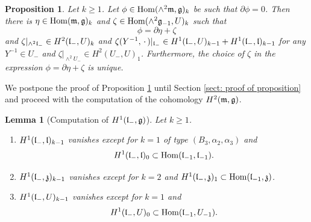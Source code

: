 \documentclass[12pt]{amsart}
\theoremstyle{plain}
\newtheorem{lemma} [theorem]{Lemma}
\newtheorem{proposition}[theorem]{Proposition}
\theoremstyle{definition}
\def\Hom{\operatorname{Hom}}
\begin{document}
\begin{proposition} \label{prop: computation of H2 cohomology} Let $k \geq 1$.
%
 Let $\phi \in \Hom(\wedge^2 \frak m, \frak g)_k$ be such that $\partial \phi=0$.
 Then there is $\eta \in  \Hom(\frak m, \frak g)_k$ and  $\zeta \in \Hom(\wedge^2 \frak g_{-1}, U )_k$  such that
 $$\phi = \partial \eta + \zeta   $$
 and $\zeta|_{\wedge^2 \frak l_-} \in H^2(\frak l_-, U  )_k$ and $\zeta(Y^{-1}, \,\cdot\,)|_{\frak l_{-}} \in H^1(\frak l_-, U)_{k-1}+H^1(\frak l_-, \frak l)_{k-1}$ for any $Y^{-1} \in U_-$ and $\zeta|_{\wedge^2U_-} \in H^2(U_-, U)_1$.
 Furthermore, the choice of $\zeta$ in the  expression $\phi = \partial \eta + \zeta   $ is unique.
\end{proposition}

 We postpone the proof of  Proposition \ref{prop: computation of H2 cohomology} until Section \ref{sect: proof of proposition} and proceed with the computation of the  cohomology $H^2(\frak m, \frak g)$.

\begin{lemma} [Computation of $H^1(\frak l_-, \frak g)$] \label{lem:H1 vanishing semisimple} Let $k \geq 1$.

\begin{enumerate}
\item[(i)] $H^1(\frak l_-, \frak l)_{k-1}$ vanishes except for $k=1$ of type $(B_3, \alpha_{2}, \alpha_3 )$ and $$H^1(\frak l_-, \frak l)_{0} \subset \Hom(\frak l_{-1}, \frak l_{-1}).$$
\item[(ii)] $H^1(\frak l_-, \frak z)_{k-1}$ vanishes except for $k =2$ and $H^1(\frak l_-,\frak z)_1 \subset \Hom(\frak l_{-1}, \frak z)$.
\item[(iii)] $H^1(\frak l_-, U)_{k-1}$ vanishes except for $k =1$ and $$H^1(\frak l_-, U)_0\subset \Hom( \frak l_{-1}, U_{-1}).$$
\end{enumerate}

\end{lemma}
\end{document}
